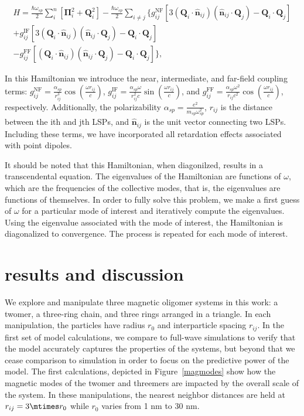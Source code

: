 \documentclass[journal=apchd5,manuscript=article]{achemso}
\begin{document}
\begin{equation}
\begin{aligned}
H = 
\frac{\hbar\omega_{sp}}{2}\sum_{i}^{n}[\boldsymbol{\Pi}_i^2 + \textbf{Q}_i^2] - \frac{\hbar\omega_{sp}}{2}\sum_{i\neq j}\{g_{ij}^{\textrm{NF}}\left[3(\textbf{Q}_i\cdot\hat{\textbf{n}}_{ij})(\hat{\textbf{n}}_{ij}\cdot\textbf{Q}_j) - \textbf{Q}_i\cdot\textbf{Q}_j\right] \\
+ g_{ij}^{\textrm{IF}}\left[3(\textbf{Q}_i\cdot\hat{\textbf{n}}_{ij})(\hat{\textbf{n}}_{ij}\cdot\textbf{Q}_j) -\textbf{Q}_i\cdot\textbf{Q}_j\right] \\ 
- g_{ij}^{\textrm{FF}}\left[(\textbf{Q}_i\cdot\hat{\textbf{n}}_{ij})(\hat{\textbf{n}}_{ij}\cdot\textbf{Q}_j) -\textbf{Q}_i\cdot\textbf{Q}_j\right]\},\label{elec_hammy_2}
\end{aligned}
\end{equation}

In this Hamiltonian we introduce the near, intermediate, and far-field coupling terms: $g_{ij}^{\textrm{NF}} = \frac{\alpha_{sp}}{r_{ij}^3}\cos\left(\frac{\omega r_{ij}}{c}\right)$, $g_{ij}^{\textrm{IF}} = \frac{\alpha_{sp}\omega}{r_{ij}^2 c}\sin\left(\frac{\omega r_{ij}}{c}\right)$, and $g_{ij}^{\textrm{FF}} = \frac{\alpha_{sp}\omega^2}{r_{ij} c^2}\cos\left(\frac{\omega r_{ij}}{c}\right)$, respectively. Additionally, the polarizability $\alpha_{sp} = \frac{e^2}{m_{sp}\omega_{sp}^2}$, $r_{ij}$ is the distance between the ith and jth LSPs, and $\hat{\textbf{n}}_{ij}$ is the unit vector connecting two LSPs. Including these terms, we have incorporated all retardation effects associated with point dipoles\cite{Purcell1973}.

It should be noted that this Hamiltonian, when diagonilzed, results in a transcendental equation. The eigenvalues of the Hamiltonian are functions of $\omega$, which are the frequencies of the collective modes, that is, the eigenvalues are functions of themselves. In order to fully solve this problem, we make a first guess of $\omega$ for a particular mode of interest and iteratively compute the eigenvalues. Using the eigenvalue associated with the mode of interest, the Hamiltonian is diagonalized to convergence. The process is repeated for each mode of interest.

\section{results and discussion}

We explore and manipulate three magnetic oligomer systems in this work: a twomer, a three-ring chain, and three rings arranged in a triangle. In each manipulation, the particles have radius $r_0$ and interparticle spacing $r_{ij}$. In the first set of model calculations, we compare to full-wave simulations to verify that the model accurately captures the properties of the systems, but beyond that we cease comparison to simulation in order to focus on the predictive power of the model. The first calculations, depicted in Figure~\ref{magmodes} show how the magnetic modes of the twomer and threemers are impacted by the overall scale of the system. In these manipulations, the nearest neighbor distances are held at $r_{ij} = 3 \mtimes r_0$ while $r_0$ varies from 1 nm to 30 nm.
\end{document}
